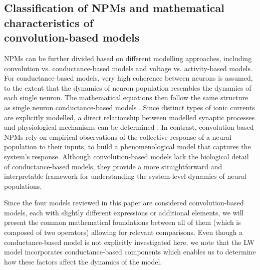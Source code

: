 \documentclass[12pt,twoside]{article}
\begin{document}
\subsection{Classification of NPMs and mathematical characteristics of \\ convolution-based models}
NPMs can be further divided based on different modelling approaches, including convolution vs. conductance-based models and voltage vs. activity-based models. For conductance-based models, very high coherence between neurons is assumed, to the extent that the dynamics of neuron population resembles the dynamics of each single neuron. The mathematical equations then follow the same structure as single neuron conductance-based models \citep{marreiros2010dynamic,breakspear2017dynamic}. Since distinct types of ionic currents are explicitly modelled, a direct relationship between modelled synaptic processes and physiological mechanisms can be determined \citep{moran2011vivo}. In contrast, convolution-based NPMs rely on empirical observations of the collective response of a neural population to their inputs, to build a phenomenological model that captures the system's response. 
Although convolution-based models lack the biological detail of conductance-based models, they provide a more straightforward and interpretable framework for understanding the system-level dynamics of neural populations.

Since the four models reviewed in this paper are considered convolution-based models, each with slightly different expressions or additional elements, we will present the common mathematical foundations between all of them (which is composed of two operators) allowing for relevant comparisons. Even though a conductance-based model is not explicitly investigated here, we note that the LW model incorporates conductance-based components which enables us to determine how these factors affect the dynamics of the model. %
\end{document}
